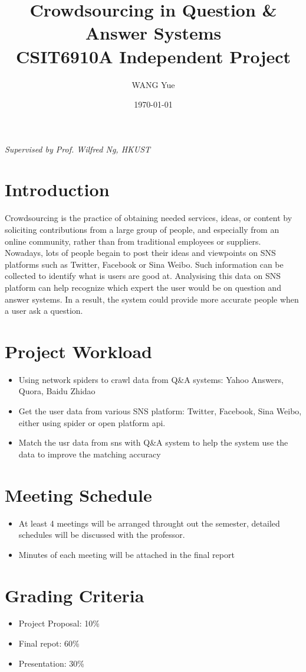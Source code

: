 \documentclass[a4paper]{article}
\title{\large \textbf{Crowdsourcing in Question \& Answer Systems}\\ CSIT6910A Independent Project}
\author{\small WANG Yue}
\date{\small \today}
\begin{document}
\maketitle
\centerline{\emph{Supervised by Prof. Wilfred Ng, HKUST}}
\section{Introduction}

Crowdsourcing is the practice of obtaining needed services, ideas, or content by soliciting contributions from a large group of people, and especially from an online community, rather than from traditional employees or suppliers. Nowadays, lots of people begain to post their ideas and viewpoints on SNS platforms such as Twitter, Facebook or Sina Weibo. Such information can be collected to identify what is users are good at. Analysising this data on SNS platform can help recognize which
expert the user would be on question and answer systems. In a result, the system could provide more accurate people when a user ask a question.

\section{Project Workload}
\begin{itemize}
        \item Using network spiders to crawl data from Q\&A systems: Yahoo Answers, Quora, Baidu Zhidao
        \item Get the user data from various SNS platform: Twitter, Facebook, Sina Weibo, either using spider or open platform api.
        \item Match the usr data from sns with Q\&A system to help the system use the data to improve the matching accuracy
\end{itemize}

\section{Meeting Schedule}
\begin{itemize}
        \item At least 4 meetings will be arranged throught out the semester, detailed schedules will be discussed with the professor.
        \item Minutes of each meeting will be attached in the final report
\end{itemize}
\section{Grading Criteria}
\begin{itemize}
        \item Project Proposal: 10\%
        \item Final repot: 60\%
        \item Presentation: 30\%
\end{itemize}
\end{document}
